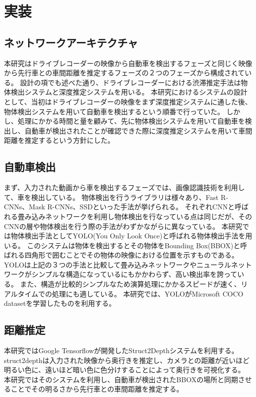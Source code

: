 \newpage
\section{実装}
\subsection{ネットワークアーキテクチャ}
本研究はドライブレコーダーの映像から自動車を検出するフェーズと同じく映像から先行車との車間距離を推定するフェーズの２つのフェーズから構成されている。
設計の項でも述べた通り、ドライブレコーダーにおける渋滞推定手法は物体検出システムと深度推定システムを用いる。
本研究におけるシステムの設計として、当初はドライブレコーダーの映像をまず深度推定システムに通した後、物体検出システムを用いて自動車を検出するという順番で行っていた。
しかし、処理にかかる時間と量を顧みて、先に物体検出システムを用いて自動車を検出し、自動車が検出されたことが確認できた際に深度推定システムを用いて車間距離を推定するという方針にした。


\subsection{自動車検出}
まず、入力された動画から車を検出するフェーズでは、画像認識技術を利用して、車を検出している。
物体検出を行うライブラリは様々あり、Fast R-CNNs、Mask R-CNNs、SSDといった手法が挙げられる。
それぞれCNNと呼ばれる畳み込みネットワークを利用し物体検出を行なっている点は同じだが、そのCNNの層や物体検出を行う際の手法がわずかながらに異なっている。
本研究では物体検出手法としてYOLO(You Only Look Once)と呼ばれる物体検出手法を用いる。
このシステムは物体を検出するとその物体をBounding Box(BBOX)と呼ばれる四角形で囲むことでその物体の映像における位置を示すものである。
YOLOは上記の３つの手法と比較して畳み込みネットワークやニューラルネットワークがシンプルな構造になっているにもかかわらず、高い検出率を誇っている。
また、構造が比較的シンプルなため演算処理にかかるスピードが速く、リアルタイムでの処理にも適している。
本研究では、YOLOがMicrosoft COCO datasetを学習したものを利用する。

\subsection{距離推定}
本研究ではGoogle Tensorflowが開発したStruct2Depthシステムを利用する。
struct2depthは入力された映像から奥行きを推定し、カメラとの距離が近いほど明るい色に、遠いほど暗い色に色分けすることによって奥行きを可視化する。
本研究ではそのシステムを利用し、自動車が検出されたBBOXの場所と同期させることでその明るさから先行車との車間距離を推定する。

